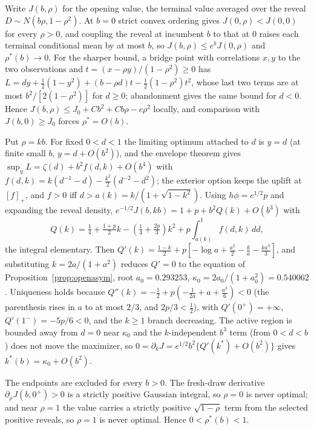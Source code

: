 \documentclass[11pt]{article}
\theoremstyle{itheads}
\begin{document}
Write $J(b,\rho)$ for the opening value, the terminal value averaged
over the reveal $D\sim N(b\rho,1-\rho^{2})$. At $b=0$ strict convex
ordering gives $J(0,\rho)<J(0,0)$ for every $\rho>0$, and coupling the
reveal at incumbent $b$ to that at $0$ raises each terminal conditional
mean by at most $b$, so $J(b,\rho)\le e^{b}J(0,\rho)$ and
$\rho^{*}(b)\to0$. For the sharper bound, a bridge point with
correlations $x,y$ to the two observations and
$t=(x-\rho y)/(1-\rho^{2})\ge0$ has
$L=dy+\tfrac12(1-y^{2})+(b-\rho d)t-\tfrac12(1-\rho^{2})t^{2}$, whose
last two terms are at most $b^{2}/[2(1-\rho^{2})]$ for $d\ge0$;
abandonment gives the same bound for $d<0$. Hence
$J(b,\rho)\le J_0+Cb^{2}+Cb\rho-c\rho^{2}$ locally, and comparison with
$J(b,0)\ge J_0$ forces $\rho^{*}=O(b)$.

Put $\rho=kb$. For fixed $0<d<1$ the limiting optimum attached to $d$
is $y=d$ (at finite small $b$, $y=d+O(b^{2})$), and the envelope theorem
gives
$\sup_y L=\zeta(d)+b^{2}f(d,k)+O(b^{4})$ with
$f(d,k)=k(d^{-1}-d)-\tfrac{k^{2}}{2}(d^{-2}-d^{2})$; the exterior option
keeps the uplift at $[f]_+$, and $f>0$ iff $d>a(k)=k/(1+\sqrt{1-k^{2}})$.
Using $h\phi=e^{1/2}p$ and expanding the reveal density,
$e^{-1/2}J(b,kb)=1+p+b^{2}Q(k)+O(b^{3})$ with
\begin{equation}
Q(k)=\tfrac14+\tfrac{1+p}{2}k-\left(\tfrac14+\tfrac{2p}{3}\right)k^{2}
+p\!\int_{a(k)}^{1}\!f(d,k)\,dd,
\end{equation}
the integral elementary. Then
$Q'(k)=\tfrac{1-k}{2}+p[-\log a+\tfrac{a^{2}}{2}-\tfrac{k}{a}
-\tfrac{ka^{3}}{3}]$, and substituting $k=2a/(1+a^{2})$ reduces $Q'=0$
to the equation of Proposition~\ref{prop:openasym}, root
$a_0=0.293253$, $\kappa_0=2a_0/(1+a_0^{2})=0.540062$. Uniqueness holds
because $Q''(k)=-\tfrac12+p(-\tfrac1{2a}+a+\tfrac{a^{3}}{6})<0$ (the
parenthesis rises in $a$ to at most $2/3$, and $2p/3<\tfrac12$), with
$Q'(0^{+})=+\infty$, $Q'(1^{-})=-5p/6<0$, and the $k\ge1$ branch
decreasing. The active region is bounded away from $d=0$ near
$\kappa_0$ and the $k$-independent $b^{3}$ term (from $0<d<b$) does not
move the maximizer, so $0=\partial_k J=e^{1/2}b^{2}\{Q'(k^{*})+O(b^{2})\}$
gives $k^{*}(b)=\kappa_0+O(b^{2})$.

The endpoints are excluded for every $b>0$. The fresh-draw derivative
$\partial_\rho J(b,0^{+})>0$ is a strictly positive Gaussian integral,
so $\rho=0$ is never optimal; and near $\rho=1$ the value carries a
strictly positive $\sqrt{1-\rho}$ term from the selected positive
reveals, so $\rho=1$ is never optimal. Hence $0<\rho^{*}(b)<1$.
\end{document}
